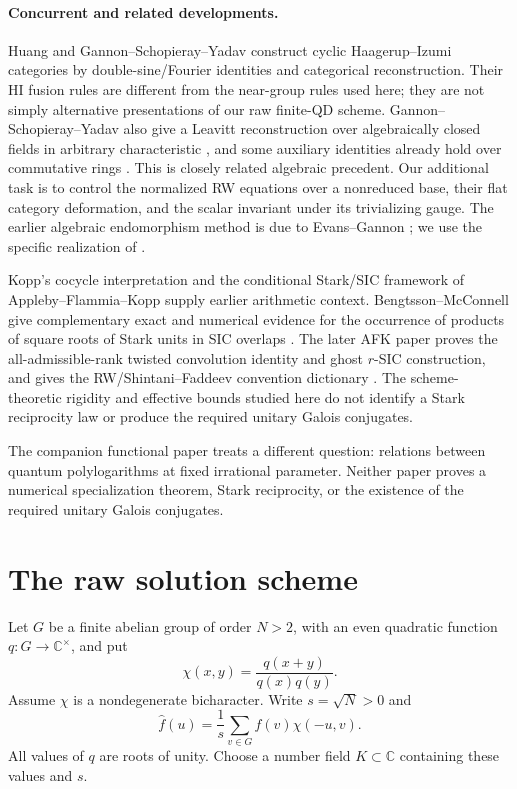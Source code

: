 \documentclass[11pt]{article}
\theoremstyle{remark}
\newcommand{\C}{\mathbb C}
\begin{document}
\paragraph{Concurrent and related developments.}
Huang \cite{Huang2026} and Gannon--Schopieray--Yadav \cite{GSY2026}
construct cyclic Haagerup--Izumi categories by double-sine/Fourier identities
and categorical reconstruction. Their HI fusion rules are different from
the near-group rules used here; they are not simply alternative
presentations of our raw finite-QD scheme. Gannon--Schopieray--Yadav also
give a Leavitt reconstruction over algebraically closed fields in arbitrary
characteristic \cite[Theorems~2.5 and~B.20]{GSY2026}, and some auxiliary
identities already hold over commutative rings \cite[Theorem~A.3]{GSY2026}.
This is closely related algebraic precedent. Our additional task is to
control the normalized RW equations over a nonreduced base, their flat
category deformation, and the scalar invariant under its trivializing gauge.
The earlier algebraic endomorphism method is due to Evans--Gannon
\cite{EvansGannon2017}; we use the specific realization of \cite{RW2}.

Kopp's cocycle interpretation \cite{Kopp2024} and the conditional Stark/SIC
framework of Appleby--Flammia--Kopp \cite{AFK2025} supply earlier arithmetic
context. Bengtsson--McConnell give complementary exact and numerical evidence
for the occurrence of products of square roots of Stark units in SIC overlaps
\cite{BengtssonMcConnell2026}. The later AFK paper proves the
all-admissible-rank twisted convolution identity and ghost $r$-SIC
construction, and gives the RW/Shintani--Faddeev convention dictionary
\cite[Theorem~1.3 and Proposition~2.1]{AFK}. The scheme-theoretic rigidity and effective bounds
studied here do not identify a Stark reciprocity law or produce the required
unitary Galois conjugates.

The companion functional paper \cite{LongQuantum} treats a different question:
relations between quantum polylogarithms at fixed irrational parameter.
Neither paper proves a numerical specialization theorem, Stark reciprocity,
or the existence of the required unitary Galois conjugates.

\section{The raw solution scheme}
Let $G$ be a finite abelian group of order $N>2$, with an even quadratic function
$q:G\to\C^\times$, and put
\[
 \chi(x,y)=\frac{q(x+y)}{q(x)q(y)}.
\]
Assume $\chi$ is a nondegenerate bicharacter. Write $s=\sqrt N>0$ and
\[
 \widehat f(u)=\frac1s\sum_{v\in G}f(v)\chi(-u,v).
\]
All values of $q$ are roots of unity. Choose a number field
$K\subset\C$ containing these values and $s$.
\end{document}

